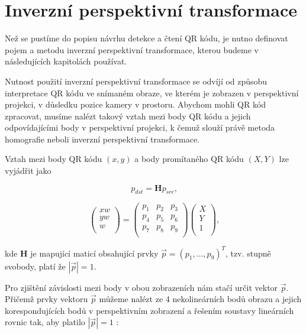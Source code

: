 \bigskip
\section{Inverzní perspektivní transformace}
\label{inverzniPerspektivniTransformace}

Než se pustíme do popisu návrhu detekce a čtení QR kódu, je nutno definovat
pojem a metodu inverzní perspektivní transformace, kterou budeme v následujících
kapitolách používat.

Nutnost použití inverzní perspektivní transformace se odvíjí od způsobu
interpretace QR kódu ve snímaném obraze, ve kterém je zobrazen v perspektivní
projekci, v důsledku pozice kamery v prostoru. Abychom mohli QR kód zpracovat,
musíme nalézt takový vztah mezi body QR kódu a jejich odpovídajícími body v
perspektivní projekci, k čemuž slouží právě metoda homografie neboli inverzní
perspektivní transformace.

Vztah mezi body QR kódu $(x,y)$ a body promítaného QR kódu
$(X,Y)$ lze vyjádřit jako

\begin{equation}
  p_{dst} = \mathbf{H} p_{src}\mbox{,}
\end{equation}

\begin{equation}
  \left(
    \begin{array}{c}
      x w \\
      y w \\
      w \\
    \end{array}
  \right)
  =
  \left(
    \begin{array}{ccc}
      p_{1} & p_{2}  & p_{3} \\
      p_{4} & p_{5}  & p_{6} \\
      p_{7} & p_{8}  & p_{9} \\
    \end{array}
  \right)
  \left(
    \begin{array}{c}
      X \\
      Y \\
      1 \\
    \end{array}
  \right)\mbox{,}
\end{equation}

\bigskip \noindent kde $\mathbf{H}$ je mapující maticí obsahující prvky $\vec{p}
= (p_1, \ldots, p_9)^T$, tzv. stupně svobody, platí že $|\vec{p}|=1$. 

Pro zjištění závislosti mezi body v obou zobrazeních nám stačí určit vektor
$\vec{p}$. Přičemž prvky vektoru $\vec{p}$ můžeme nalézt ze 4 nekolineárních
bodů obrazu a jejich korespondujících bodů v perspektivním zobrazení a řešením 
soustavy lineárních rovnic tak, aby 
platilo $|\vec{p}|=1$ \cite{homografieCite,homografieComputerVision}: 

